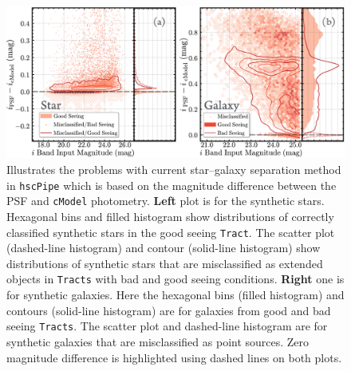 \documentclass[useamsfonts]{pasj01}
\def\hscpipe{\texttt{hscPipe}}
\def\cmodel{\texttt{cModel}}
\def\tract{\texttt{Tract}}
\def\tracts{\texttt{Tracts}}
\begin{document}
\begin{figure}
    \begin{center}
        \includegraphics[width=\textwidth]{fig/synpipe_star_galaxy}
    \end{center}
    \caption{
        Illustrates the problems with current star--galaxy separation method in 
        \hscpipe{} which is based on the magnitude difference between the PSF and 
        \cmodel{} photometry. 
        \textbf{Left} plot is for the synthetic stars. 
        Hexagonal bins and filled histogram show distributions of correctly classified 
        synthetic stars in the good seeing \tract{}. 
        The scatter plot (dashed-line histogram) and contour (solid-line histogram) 
        show distributions of synthetic stars that are misclassified as extended 
        objects in \tracts{} with bad and good seeing conditions. 
        \textbf{Right} one is for synthetic galaxies. 
        Here the hexagonal bins (filled histogram) and contours (solid-line histogram)
        are for galaxies from good and bad seeing \tracts{}. 
        The scatter plot and dashed-line histogram are for synthetic galaxies that are 
        misclassified as point sources.
        Zero magnitude difference is highlighted using dashed lines on both plots.
        }
    \label{fig:sg}
\end{figure}
\end{document}
